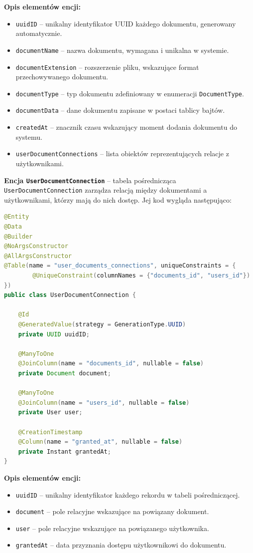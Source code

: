 \textbf{Opis elementów encji:}
\begin{itemize}
    \item \texttt{uuidID} -- unikalny identyfikator UUID każdego dokumentu, generowany automatycznie.
    \item \texttt{documentName} -- nazwa dokumentu, wymagana i unikalna w systemie.
    \item \texttt{documentExtension} -- rozszerzenie pliku, wskazujące format przechowywanego dokumentu.
    \item \texttt{documentType} -- typ dokumentu zdefiniowany w enumeracji \texttt{DocumentType}.
    \item \texttt{documentData} -- dane dokumentu zapisane w postaci tablicy bajtów.
    \item \texttt{createdAt} -- znacznik czasu wskazujący moment dodania dokumentu do systemu.
    \item \texttt{userDocumentConnections} -- lista obiektów reprezentujących relacje z użytkownikami.
\end{itemize}

\textbf{Encja \texttt{UserDocumentConnection}} -- tabela pośrednicząca \texttt{UserDocumentConnection} zarządza relacją między dokumentami a użytkownikami, którzy mają do nich dostęp. Jej kod wygląda następująco:

\begin{lstlisting}[language=Java, caption=Encja \texttt{UserDocumentConnection}]
@Entity
@Data
@Builder
@NoArgsConstructor
@AllArgsConstructor
@Table(name = "user_documents_connections", uniqueConstraints = {
        @UniqueConstraint(columnNames = {"documents_id", "users_id"})
})
public class UserDocumentConnection {

    @Id
    @GeneratedValue(strategy = GenerationType.UUID)
    private UUID uuidID;

    @ManyToOne
    @JoinColumn(name = "documents_id", nullable = false)
    private Document document;

    @ManyToOne
    @JoinColumn(name = "users_id", nullable = false)
    private User user;

    @CreationTimestamp
    @Column(name = "granted_at", nullable = false)
    private Instant grantedAt;
}
\end{lstlisting}

\textbf{Opis elementów encji:}
\begin{itemize}
    \item \texttt{uuidID} -- unikalny identyfikator każdego rekordu w tabeli pośredniczącej.
    \item \texttt{document} -- pole relacyjne wskazujące na powiązany dokument.
    \item \texttt{user} -- pole relacyjne wskazujące na powiązanego użytkownika.
    \item \texttt{grantedAt} -- data przyznania dostępu użytkownikowi do dokumentu.
\end{itemize}

